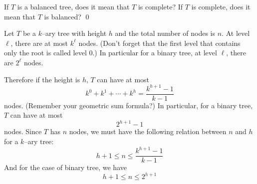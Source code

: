 \begin{ex}
If $T$ is a balanced tree, does it mean that $T$ is complete?
If $T$ is complete, does it mean that $T$ is balanced?
\qed
\end{ex}

Let $T$ be a $k$--ary tree with height $h$ and the total 
number of nodes is $n$.
At level $\ell$,
there are at most $k^\ell$ nodes.
(Don't forget that the first level that contains only the root
is called level $0$.)
In particular for a binary tree, at level $\ell$, 
there are $2^\ell$ nodes.

Therefore if the height is $h$, $T$ can have at most
\[
k^0 + k^1 + \cdots + k^h = \frac{k^{h+1} - 1}{k-1}
\]
nodes.
(Remember your geometric sum formula?)
In particular, for a binary tree, $T$ can have at most
\[
2^{h+1} - 1
\]
nodes.
Since $T$ has $n$ nodes, we must have the following relation
between $n$ and $h$ for a $k$--ary tree:
\[
h + 1 \leq n \leq \frac{k^{h+1} - 1}{k-1}
\]
And for the case of binary tree, we have
\[
h + 1 \leq n \leq 2^{h+1}
\]

